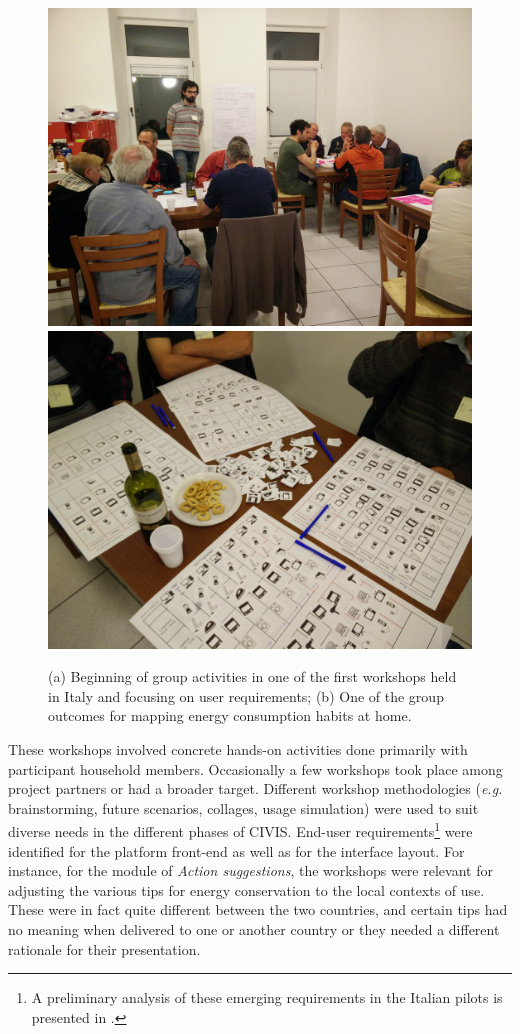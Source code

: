 
\begin{figure}[t]
      	\sidecaption[t]
        \includegraphics[width=.3\linewidth]{img/Workshop_userreq1.jpg}
	        \includegraphics[width=.3\linewidth]{img/Workshop_userreq2.jpg} 
    \caption{(a) Beginning of group activities in one of the first workshops held in Italy and focusing
    on user requirements; (b) One of the group outcomes for mapping energy consumption habits at home. 
}
\label{fig:workshops}
\end{figure}

These workshops involved concrete hands-on activities done primarily with participant household members.
Occasionally a few workshops took place among project partners or had a broader target.
Different workshop methodologies (\textit{e.g.} brainstorming, future scenarios,
collages, usage simulation) were used to suit diverse needs in the different phases of CIVIS.
End-user requirements\footnote{A preliminary analysis of these emerging requirements in the Italian pilots
is presented in \cite{capaccioli_participatory_2016}.} were identified for the platform front-end as well as for the interface layout.
% 
For instance, for the module of \textit{Action suggestions}, the workshops were relevant for adjusting the various
tips for energy conservation to the local contexts of use. These were in fact quite different between the two countries,
 and certain tips had no meaning when delivered to one or another country or they needed a different
 rationale for their presentation.
 

